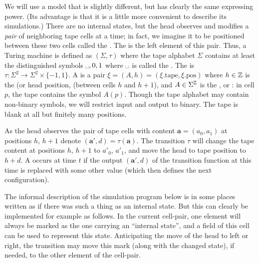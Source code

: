 \documentclass[11pt]{memoir}
\theoremstyle{definition} %
\renewcommand{\vek}[1]{\mathbf{#1}}
\newcommand{\va}{\vek{a}} %
\newcommand{\blank}{\text{\textvisiblespace}}
\newcommand{\h}{h} %
\newcommand{\pos}{\mathrm{pos}}
\newcommand{\tape}{\mathrm{tape}}
\begin{document}
We will use a model that is slightly different, but has clearly the same expressing power.
(Its advantage is that it is a little more convenient to describe its simulations.)
There are no internal states, but the head observes and modifies a \emph{pair} of
neighboring tape cells at a time; in fact, we imagine it to be positioned between these
two cells called the .
The  is the left element of this pair.
Thus, a Turing machine is defined as \(    (\Sigma,\tau) \) where
the tape alphabet \( \Sigma \) contains at least the distinguished
symbols \( \blank,0,1 \) where \( \blank \) is called the .
The  is
\(  \tau\colon\Sigma^{2}\to \Sigma^{2}\times\{-1,1\} \).
A  is a pair \( \xi = (A,\h) = (\xi.\tape,\xi.\pos) \)
where  \( \h\in\bbZ \) is the  (or 
head position, (between cells \( h \) and \( h+1 \)),
and \( A\in\Sigma^{\mathbb{Z}} \) is the , or :
in cell \( p \), the tape contains the symbol \( A(p) \).
Though the tape alphabet may contain
non-binary symbols, we will restrict input and output to binary.
The tape is blank at all but finitely many positions.

As the head observes the pair of tape cells
with content \( \va=(a_{0},a_{1}) \) at positions \( \h \), \( \h+1 \) denote \(  (\va',d)=\tau(\va)  \).
The transition \( \tau \) will
change the tape content at positions \( \h \), \( \h+1 \) to \( a'_{0} \), \( a'_{1} \),
and move the head to tape position to \( \h+d \).
A  occurs at time \( t \) if the output \( (\va',d) \)
of the    transition function at this time is replaced with some other value
(which then defines the next configuration).


\begin{remark}\label{rem:internal-state}
  The informal description of the simulation program below is in some places
  written as if there was such a thing as an internal state.
  But this can clearly be implemented for example as follows.
  In the current cell-pair, one element will always be marked as the one carrying an ``internal state'',
  and a field of this cell can be used to represent this state.
  Anticipating the move of the head to left or right,
  the transition may move this mark (along with the changed state), if needed,
  to the other element of the cell-pair.
\end{remark}
\end{document}
